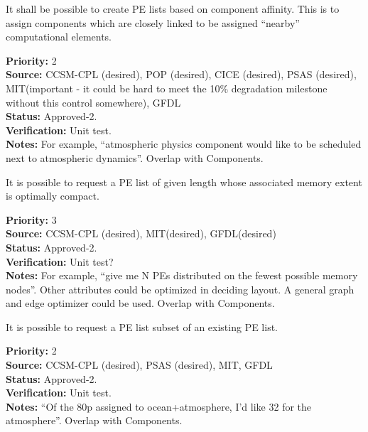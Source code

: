 
It shall be possible to create PE lists based on component affinity. This is
to assign components which are closely linked to be assigned
``nearby'' computational elements.

\begin{reqlist}
{\bf Priority:}  2 \\
{\bf Source:}  CCSM-CPL (desired), POP (desired), CICE (desired), PSAS (desired),
MIT(important - it could be hard to meet the 10\% degradation milestone without
this control somewhere), GFDL \\
{\bf Status:} Approved-2. \\
{\bf Verification:} Unit test. \\ 
{\bf Notes:}  For example, ``atmospheric physics component would like 
to be scheduled next to atmospheric dynamics''.  Overlap with Components.
\end{reqlist}


It is possible to request a PE list of given length whose associated
memory extent is optimally compact.

\begin{reqlist}
{\bf Priority:} 3 \\
{\bf Source:}  CCSM-CPL (desired), MIT(desired), GFDL(desired) \\
{\bf Status:} Approved-2. \\
{\bf Verification:} Unit test?\\ 
{\bf Notes:}  For example, ``give me N PEs distributed on the fewest possible
  memory nodes''. Other attributes could be optimized in deciding layout.
A general graph and edge optimizer could be used.  Overlap with Components.
\end{reqlist}


It is possible to request a PE list subset of an existing PE list.

\begin{reqlist}
{\bf Priority:} 2 \\
{\bf Source:}  CCSM-CPL (desired), PSAS (desired), MIT, GFDL \\
{\bf Status:} Approved-2. \\
{\bf Verification:} Unit test.\\ 
{\bf Notes:}  ``Of the 80p assigned to ocean+atmosphere, I'd like 32
  for the atmosphere''.  Overlap with Components.
\end{reqlist}

